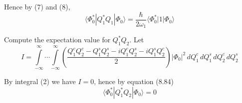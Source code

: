\documentclass[12pt]{article}
\newcommand\U{\vert\Phi_0\vert^2}
\begin{document}
Hence by (7) and (8),
\begin{equation*}
\langle\Phi_0^*|Q_1^*Q_1|\Phi_0\rangle=\frac{\hbar}{2\omega_1}\langle\Phi_0^*|1|\Phi_0\rangle
\end{equation*}

Compute the expectation value for $Q_1^*Q_2$.
Let
\begin{equation*}
I=\int\limits_{-\infty}^\infty\cdots\int\limits_{-\infty}^\infty
\left(\frac{Q_1^cQ_2^c-Q_1^sQ_2^s-iQ_1^cQ_2^s-iQ_1^sQ_2^c}{2}\right)
\U\,dQ_1^c\,dQ_1^s\,dQ_2^c\,dQ_2^s
\end{equation*}

By integral (2) we have $I=0$, hence by equation (8.84)
\begin{equation*}
\langle\Phi_0^*|Q_1^*Q_2|\Phi_0\rangle=0
\end{equation*}
\end{document}
